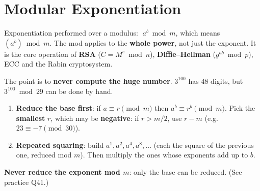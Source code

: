 \section{Modular Exponentiation}\label{sec:modexp}

\begin{keybox}
Exponentiation performed over a modulus: $\;a^b \bmod m$, which means $(a^b) \bmod m$. The mod applies to the \textbf{whole power}, not just the exponent.
It is the core operation of \textbf{RSA} ($C = M^e \bmod n$), \textbf{Diffie--Hellman} ($g^{ab} \bmod p$), ECC and the Rabin cryptosystem.
\end{keybox}
The point is to \textbf{never compute the huge number}. $3^{100}$ has 48 digits, but $3^{100} \bmod 29$ can be done by hand.

\begin{keybox}[title=The two tools]
\begin{enumerate}[leftmargin=1.5em]
  \item \textbf{Reduce the base first}: if $a \equiv r \pmod m$ then $a^b \equiv r^b \pmod m$. Pick the \textbf{smallest} $r$, which may be \textbf{negative}: if $r > m/2$, use $r - m$ (e.g.\ $23 \equiv -7 \pmod{30}$).
  \item \textbf{Repeated squaring}: build $a^1, a^2, a^4, a^8, \dots$ (each the square of the previous one, reduced mod $m$). Then multiply the ones whose exponents add up to $b$.
\end{enumerate}
\textbf{Never reduce the exponent mod $m$}: only the base can be reduced. (See practice Q41.)
\end{keybox}

